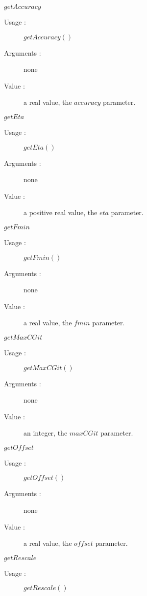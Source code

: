 \begin{description}
\item[Some methods :]  \rule{0pt}{1em}

  \begin{description}

  \item $getAccuracy$
    \begin{description}
    \item[Usage :] $getAccuracy()$
    \item[Arguments :] none
    \item[Value :]  a real value, the $accuracy$ parameter.
    \end{description}
    \bigskip
  \item $getEta$
    \begin{description}
    \item[Usage :] $getEta()$
    \item[Arguments :] none
    \item[Value :]  a positive real value, the $eta$ parameter.
    \end{description}
    \bigskip
  \item $getFmin$
    \begin{description}
    \item[Usage :] $getFmin()$
    \item[Arguments :] none
    \item[Value :]  a real value, the $fmin$ parameter.
    \end{description}
    \bigskip
  \item $getMaxCGit$
    \begin{description}
    \item[Usage :] $getMaxCGit()$
    \item[Arguments :] none
    \item[Value :]  an integer, the $maxCGit$ parameter.
    \end{description}
    \bigskip
  \item $getOffset$
    \begin{description}
    \item[Usage :] $getOffset()$
    \item[Arguments :] none
    \item[Value :]  a real value, the $offset$ parameter.
    \end{description}
    \bigskip
  \item $getRescale$
    \begin{description}
    \item[Usage :] $getRescale()$

\end{description}
\end{description}
\end{description}
